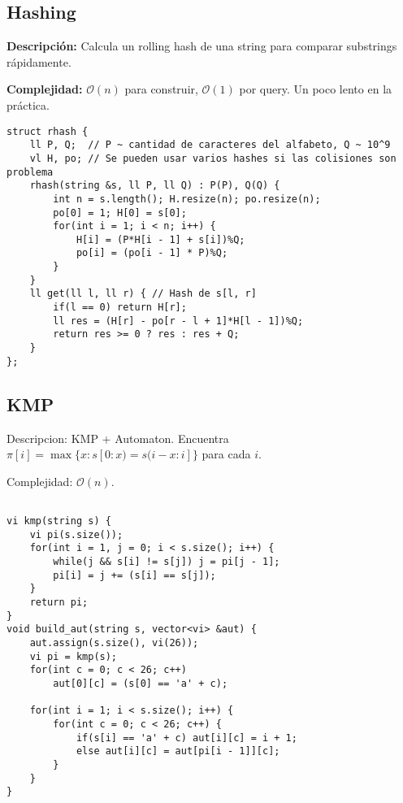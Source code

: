 \documentclass[twocolumn]{article}
\begin{document}
\subsection{Hashing}
\begin{footnotesize}{\bf Descripción: } Calcula un rolling hash de una string para comparar substrings rápidamente.


{\bf Complejidad: } $\mathcal{O}(n)$ para construir, $\mathcal{O}(1)$ por query. Un poco lento en la práctica.
\end{footnotesize}\lstset{basicstyle=\footnotesize\ttfamily,breaklines=true,tabsize=2,language=C++,frame=leftline, numbers=left, numberstyle=\tiny, numbersep=5pt}
\begin{lstlisting}
struct rhash {
	ll P, Q;  // P ~ cantidad de caracteres del alfabeto, Q ~ 10^9
	vl H, po; // Se pueden usar varios hashes si las colisiones son problema
	rhash(string &s, ll P, ll Q) : P(P), Q(Q) {
		int n = s.length(); H.resize(n); po.resize(n);
		po[0] = 1; H[0] = s[0];
		for(int i = 1; i < n; i++) {
			H[i] = (P*H[i - 1] + s[i])%Q;
			po[i] = (po[i - 1] * P)%Q;
		}
	}
	ll get(ll l, ll r) { // Hash de s[l, r]
		if(l == 0) return H[r];
		ll res = (H[r] - po[r - l + 1]*H[l - 1])%Q;
		return res >= 0 ? res : res + Q;
	}
};
\end{lstlisting}
\subsection{KMP}
\begin{footnotesize}Descripcion: KMP + Automaton. Encuentra $\pi[i] = \max \{x \colon s[0 : x) = s(i - x : i]\}$ para cada $i$.


Complejidad: $\mathcal{O}(n)$.
\end{footnotesize}\lstset{basicstyle=\footnotesize\ttfamily,breaklines=true,tabsize=2,language=C++,frame=leftline, numbers=left, numberstyle=\tiny, numbersep=5pt}
\begin{lstlisting}

vi kmp(string s) {
	vi pi(s.size());
	for(int i = 1, j = 0; i < s.size(); i++) {
		while(j && s[i] != s[j]) j = pi[j - 1];
		pi[i] = j += (s[i] == s[j]);
	}
	return pi;
}
void build_aut(string s, vector<vi> &aut) {
	aut.assign(s.size(), vi(26));
	vi pi = kmp(s);
	for(int c = 0; c < 26; c++)
		aut[0][c] = (s[0] == 'a' + c);

	for(int i = 1; i < s.size(); i++) {
		for(int c = 0; c < 26; c++) {
			if(s[i] == 'a' + c) aut[i][c] = i + 1;
			else aut[i][c] = aut[pi[i - 1]][c];
		}
	}
}

\end{lstlisting}
\end{document}
